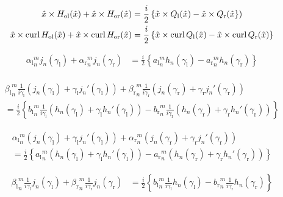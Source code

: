 \begin{align*}
  \hat{x}\times H_{\text{ol}}(\hat{x}) + \hat{x}\times H_{\text{or}}(\hat{x}) &= \frac{i}{2}\left\{\hat{x}\times Q_\text{l}(\hat{x}) - \hat{x}\times Q_\text{r}(\hat{x}\right\}) \\ 
  \hat{x}\times \operatorname{curl} H_{\text{ol}}(\hat{x}) + \hat{x}\times \operatorname{curl} H_{\text{or}}(\hat{x}) &= \frac{i}{2}\left\{\hat{x}\times \operatorname{curl} Q_\text{l}(\hat{x}) - \hat{x}\times \operatorname{curl} Q_\text{r}(\hat{x})\right\} 
\end{align*}

\begin{align*}
  {\alpha_\text{l}}_n^m j_n(\gamma_\text{l}) + {\alpha_\text{r}}_n^m j_n(\gamma_\text{r}) &=
  \frac{i}{2}\left\{{a_\text{l}}_n^m h_n(\gamma_\text{l}) - {a_\text{r}}_n^m h_n(\gamma_\text{r})\right\} \\
\end{align*}

\begin{multline*}
  {\beta_\text{l}}_n^m\frac{1}{i\gamma_\text{l}} \left(j_n(\gamma_\text{l}) + \gamma_\text{l} j_n'(\gamma_\text{l})\right) + {\beta_\text{r}}_n^m\frac{1}{i\gamma_\text{r}} \left(j_n(\gamma_\text{r}) + \gamma_\text{r} j_n'(\gamma_\text{r})\right) \\= \frac{i}{2}\left\{{b_\text{l}}_n^m\frac{1}{i\gamma_\text{l}} \left(h_n(\gamma_\text{l}) + \gamma_\text{l} h_n'(\gamma_\text{l})\right) - {b_\text{r}}_n^m\frac{1}{i\gamma_\text{r}} \left(h_n(\gamma_\text{r}) + \gamma_\text{r} h_n'(\gamma_\text{r})\right)\right\} 
\end{multline*}

\begin{multline*}
  {\alpha_\text{l}}_n^m\left(j_n(\gamma_\text{l}) + \gamma_\text{l} j_n'(\gamma_\text{l})\right) + {\alpha_\text{r}}_n^m\left(j_n(\gamma_\text{r}) + \gamma_\text{r} j_n'(\gamma_\text{r})\right) \\= \frac{i}{2}\left\{{a_\text{l}}_n^m\left(h_n(\gamma_\text{l}) + \gamma_\text{l} h_n'(\gamma_\text{l})\right) - {a_\text{r}}_n^m\left(h_n(\gamma_\text{r}) + \gamma_\text{r} h_n'(\gamma_\text{r})\right)\right\}
\end{multline*}

\begin{align*}
  {\beta_\text{l}}_n^m\frac{1}{i\gamma_\text{l}} j_n(\gamma_\text{l}) + {\beta_\text{r}}_n^m\frac{1}{i\gamma_\text{r}} j_n(\gamma_\text{r}) &= \frac{i}{2}\left\{{b_\text{l}}_n^m\frac{1}{i\gamma_\text{l}} h_n(\gamma_\text{l}) - {b_\text{r}}_n^m\frac{1}{i\gamma_\text{r}} h_n(\gamma_\text{r})\right\} 
\end{align*}

